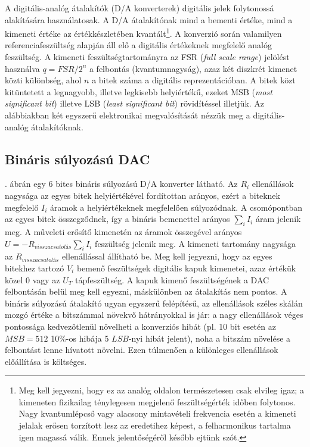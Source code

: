 \documentclass[12pt]{article}
\theoremstyle{plain}
\begin{document}
A digitális-analóg átalakítók (D/A konverterek) digitális jelek folytonossá alakítására használatosak. A D/A átalakítónak mind a bementi értéke, mind a kimeneti értéke az értékkészletében kvantált\footnote{Meg kell jegyezni, hogy ez az analóg oldalon természetesen csak elvileg igaz; a kimeneten fizikailag ténylegesen megjelenő feszültségérték időben folytonos. Nagy kvantumlépcső vagy alacsony mintavételi frekvencia esetén a kimeneti jelalak erősen torzított lesz az eredetihez képest, a felharmonikus tartalma igen magassá válik. Ennek jelentőségéről később ejtünk szót.}. A konverzió során valamilyen referenciafeszültség alapján áll elő a digitális értékeknek megfelelő analóg feszültség. A kimeneti feszültségtartományra az FSR (\textit{full scale range}) jelölést használva $q = FSR/2^n$ a felbontás (kvantumnagyság), azaz két diszkrét kimenet közti különbség, ahol $n$ a bitek száma a digitális reprezentációban. A bitek közt kitüntetett a legnagyobb, illetve legkisebb helyiértékű, ezeket MSB (\textit{most significant bit}) illetve LSB (\textit{least significant bit}) rövidítéssel illetjük.
Az alábbiakban két egyszerű elektronikai megvalósítását nézzük meg a digitális-analóg átalakítóknak.


\subsection{Bináris súlyozású DAC}

. ábrán egy 6 bites bináris súlyozású D/A konverter látható.
Az $R_i$ ellenállások nagysága az egyes bitek helyiértékével fordítottan arányos, ezért a biteknek megfelelő $I_i$ áramok a helyiértékeknek megfelelően súlyozódnak. A csomópontban az egyes bitek összegződnek, így a bináris bemenettel arányos $\sum_i I_i$ áram jelenik meg.
A műveleti erősítő kimenetén az áramok összegével arányos $U = - R_{visszacsatolás} \sum_i I_i$ feszültség jelenik meg. A kimeneti tartomány nagysága az $R_{visszacsatolás}$ ellenállással állítható be.
Meg kell jegyezni, hogy az egyes bitekhez tartozó $V_i$ bemenő feszültségek digitális kapuk kimenetei, azaz értékük közel 0 vagy az $U_T$ tápfeszültség. A kapuk kimenő feszültségének a DAC felbontásán belül meg kell egyezni, máskülönben az átalakítás nem pontos. A bináris súlyozású átalakító ugyan egyszerű felépítésű, az ellenállások széles skálán mozgó értéke a bitszámmal növekvő hátrányokkal is jár: a nagy ellenállások véges pontossága kedvezőtlenül növelheti a konverziós hibát (pl. 10 bit esetén az $MSB=512$ 10\%-os hibája 5 $LSB$-nyi hibát jelent), noha a bitszám növelése a felbontást lenne hívatott növelni. Ezen túlmenően a különleges ellenállások előállítása is költséges.
\end{document}
